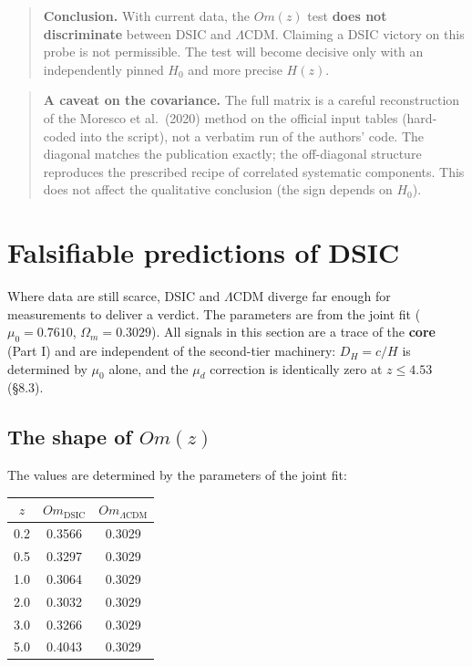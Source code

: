 \documentclass[a4paper,10pt]{article}
\begin{document}
\begin{quote}
\textbf{Conclusion.} With current data, the $Om(z)$ test \textbf{does not discriminate} between DSIC and $\Lambda$CDM. Claiming a DSIC victory on this probe is not permissible. The test will become decisive only with an independently pinned $H_0$ and more precise $H(z)$.
\end{quote}

\begin{quote}
\textbf{A caveat on the covariance.} The full matrix is a careful reconstruction of the Moresco et al.\ (2020) method on the official input tables (hard-coded into the script), not a verbatim run of the authors' code. The diagonal matches the publication exactly; the off-diagonal structure reproduces the prescribed recipe of correlated systematic components. This does not affect the qualitative conclusion (the sign depends on $H_0$).
\end{quote}

\section{Falsifiable predictions of DSIC}

Where data are still scarce, DSIC and $\Lambda$CDM diverge far enough for measurements to deliver a verdict. The parameters are from the joint fit ($\mu_0 = 0.7610$, $\Omega_m = 0.3029$). All signals in this section are a trace of the \textbf{core} (Part I) and are independent of the second-tier machinery: $D_H = c/H$ is determined by $\mu_0$ alone, and the $\mu_d$ correction is identically zero at $z \le 4.53$ (\S8.3).

\subsection{The shape of $Om(z)$}

The values are determined by the parameters of the joint fit:

\begin{table}[htbp]
\centering
\small
\begin{tabular}{@{}ccc@{}}
\toprule
$z$ & $Om_{\text{DSIC}}$ & $Om_{\Lambda\text{CDM}}$ \\
\midrule
0.2 & 0.3566 & 0.3029 \\
0.5 & 0.3297 & 0.3029 \\
1.0 & 0.3064 & 0.3029 \\
2.0 & 0.3032 & 0.3029 \\
3.0 & 0.3266 & 0.3029 \\
5.0 & 0.4043 & 0.3029 \\
\bottomrule
\end{tabular}
\end{table}
\end{document}
